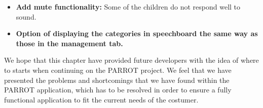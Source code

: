 \begin{itemize}
	\item \textbf{Add mute functionality:} Some of the children do not respond well to sound.
	
	\item \textbf{Option of displaying the categories in speechboard the same way as those in the management tab.}
	
\end{itemize}  

We hope that this chapter have provided future developers with the idea of where to starts when continuing on the PARROT project. 
We feel that we have presented the problems and shortcomings that we have found within the PARROT application, which has to be resolved in order to ensure a fully functional application to fit the current needs of the costumer.\\
